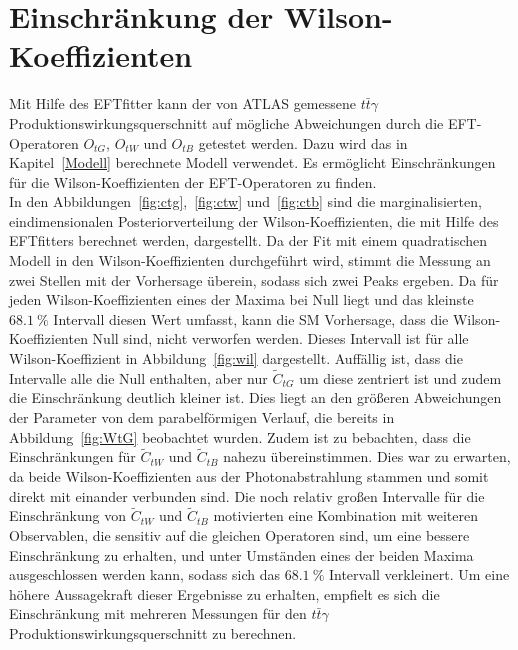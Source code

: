 \section{Einschränkung der Wilson-Koeffizienten}
Mit Hilfe des EFTfitter kann der von ATLAS gemessene $t\bar{t}\gamma$ Produktionswirkungsquerschnitt auf mögliche Abweichungen durch die EFT-Operatoren $O_{tG}$, $O_{tW}$ und $O_{tB}$ getestet werden. Dazu wird das in Kapitel~\ref{Modell} berechnete Modell verwendet. Es ermöglicht Einschränkungen für die Wilson-Koeffizienten der EFT-Operatoren zu finden.\\
In den Abbildungen~\ref{fig:ctg},~\ref{fig:ctw} und~\ref{fig:ctb} sind die marginalisierten, eindimensionalen Posteriorverteilung der Wilson-Koeffizienten, die mit Hilfe des EFTfitters berechnet werden, dargestellt. Da der Fit mit einem quadratischen Modell in den Wilson-Koeffizienten durchgeführt wird, stimmt die Messung an zwei Stellen mit der Vorhersage überein, sodass sich zwei Peaks ergeben. Da für jeden Wilson-Koeffizienten eines der Maxima bei Null liegt und das kleinste $\SI{68.1}{\percent}$ Intervall diesen Wert umfasst, kann die SM Vorhersage, dass die Wilson-Koeffizienten Null sind, nicht verworfen werden.
Dieses Intervall ist für alle Wilson-Koeffizient in Abbildung~\ref{fig:wil} dargestellt. Auffällig ist, dass die Intervalle alle die Null enthalten, aber nur $\tilde{C}_{tG}$ um diese zentriert ist und zudem die Einschränkung deutlich kleiner ist. Dies liegt an den größeren Abweichungen der Parameter von dem parabelförmigen Verlauf, die bereits in Abbildung~\ref{fig:WtG} beobachtet wurden. Zudem ist zu bebachten, dass die Einschränkungen für $\tilde{C}_{tW}$ und $\tilde{C}_{tB}$ nahezu übereinstimmen. Dies war zu erwarten, da beide Wilson-Koeffizienten aus der Photonabstrahlung stammen und somit direkt mit einander verbunden sind. Die noch relativ großen Intervalle für die Einschränkung von $\tilde{C}_{tW}$ und $\tilde{C}_{tB}$ motivierten eine Kombination mit weiteren Observablen, die sensitiv auf die gleichen Operatoren sind, um eine bessere Einschränkung zu erhalten, und unter Umständen eines der beiden Maxima ausgeschlossen werden kann, sodass sich das $\SI{68.1}{\percent}$ Intervall verkleinert. Um eine höhere Aussagekraft dieser Ergebnisse zu erhalten, empfielt es sich die Einschränkung mit mehreren Messungen für den $t\bar{t}\gamma$ Produktionswirkungsquerschnitt zu berechnen.

